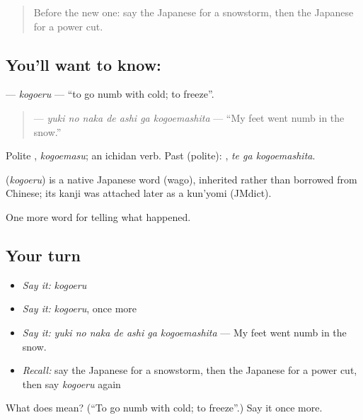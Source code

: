 \label{lesson:JA-C277-kogoeru}



\begin{quote}
Before the new one: say the Japanese for a snowstorm, then the Japanese for a power cut.
\end{quote}

\subsection*{You'll want to know: }
\textbf{} — \emph{kogoeru} — \textquotedblleft{}to go numb with cold; to freeze\textquotedblright{}.

\begin{quote}
\textbf{   } — \emph{yuki no naka de ashi ga kogoemashita} — \textquotedblleft{}My feet went numb in the snow.\textquotedblright{}
\end{quote}

Polite \textbf{}, \emph{kogoemasu}; an ichidan verb. Past (polite): \textbf{ }, \emph{te ga kogoemashita}.

\begin{cousinweb}
\textbf{} (\emph{kogoeru}) is a native Japanese word (wago), inherited rather than borrowed from Chinese; its kanji was attached later as a kun'yomi (JMdict).
\end{cousinweb}

\begin{grammarlens}[title={What you've built}]
One more word for telling what happened.
\end{grammarlens}

\subsection*{Your turn}
\begin{itemize}
\raggedright
  \item \emph{Say it:} \emph{kogoeru}
  \item \emph{Say it:} \emph{kogoeru}, once more
  \item \emph{Say it:} \emph{yuki no naka de ashi ga kogoemashita} — My feet went numb in the snow.
  \item \emph{Recall:} say the Japanese for a snowstorm, then the Japanese for a power cut, then say \emph{kogoeru} again
\end{itemize}

\begin{tcolorbox}[breakable,colback=teal!4,colframe=teal!35!black,title={Before you move on}]
What does  mean? (\textquotedblleft{}To go numb with cold; to freeze\textquotedblright{}.) Say it once more.
\end{tcolorbox}
